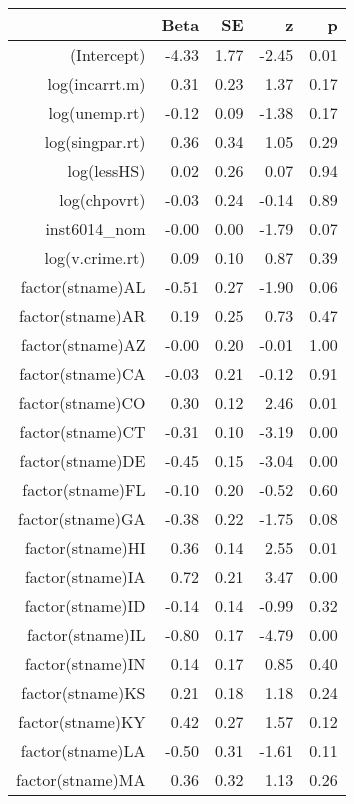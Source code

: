 \begin{table}[ht]
\centering
\begin{tabular}{rrrrr}
  \hline
 & Beta & SE & z & p \\ 
  \hline
(Intercept) & -4.33 & 1.77 & -2.45 & 0.01 \\ 
  log(incarrt.m) & 0.31 & 0.23 & 1.37 & 0.17 \\ 
  log(unemp.rt) & -0.12 & 0.09 & -1.38 & 0.17 \\ 
  log(singpar.rt) & 0.36 & 0.34 & 1.05 & 0.29 \\ 
  log(lessHS) & 0.02 & 0.26 & 0.07 & 0.94 \\ 
  log(chpovrt) & -0.03 & 0.24 & -0.14 & 0.89 \\ 
  inst6014\_nom & -0.00 & 0.00 & -1.79 & 0.07 \\ 
  log(v.crime.rt) & 0.09 & 0.10 & 0.87 & 0.39 \\ 
  factor(stname)AL & -0.51 & 0.27 & -1.90 & 0.06 \\ 
  factor(stname)AR & 0.19 & 0.25 & 0.73 & 0.47 \\ 
  factor(stname)AZ & -0.00 & 0.20 & -0.01 & 1.00 \\ 
  factor(stname)CA & -0.03 & 0.21 & -0.12 & 0.91 \\ 
  factor(stname)CO & 0.30 & 0.12 & 2.46 & 0.01 \\ 
  factor(stname)CT & -0.31 & 0.10 & -3.19 & 0.00 \\ 
  factor(stname)DE & -0.45 & 0.15 & -3.04 & 0.00 \\ 
  factor(stname)FL & -0.10 & 0.20 & -0.52 & 0.60 \\ 
  factor(stname)GA & -0.38 & 0.22 & -1.75 & 0.08 \\ 
  factor(stname)HI & 0.36 & 0.14 & 2.55 & 0.01 \\ 
  factor(stname)IA & 0.72 & 0.21 & 3.47 & 0.00 \\ 
  factor(stname)ID & -0.14 & 0.14 & -0.99 & 0.32 \\ 
  factor(stname)IL & -0.80 & 0.17 & -4.79 & 0.00 \\ 
  factor(stname)IN & 0.14 & 0.17 & 0.85 & 0.40 \\ 
  factor(stname)KS & 0.21 & 0.18 & 1.18 & 0.24 \\ 
  factor(stname)KY & 0.42 & 0.27 & 1.57 & 0.12 \\ 
  factor(stname)LA & -0.50 & 0.31 & -1.61 & 0.11 \\ 
  factor(stname)MA & 0.36 & 0.32 & 1.13 & 0.26 \\ 

\end{tabular}
\end{table}

